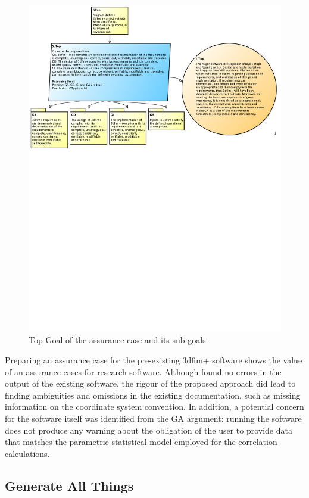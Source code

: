 \documentclass[final, 3p, times, authoryear]{elsarticle}
\begin{document}
\begin{figure}[!h]
\centering
\includegraphics[width=1.0\textwidth]{./figures/TopGoal.pdf}
\caption{Top Goal of the assurance case and its sub-goals}
\label{TopGoal}
\end{figure}

Preparing an assurance case for the pre-existing 3dfim+ software shows the value
of an assurance cases for research software. Although \citet{SmithEtAl2020}
found no errors in the output of the existing software, the rigour of the
proposed approach did lead to finding ambiguities and omissions in the existing
documentation, such as missing information on the coordinate system convention.
In addition, a potential concern for the software itself was identified from the
GA argument: running the software does not produce any warning about the
obligation of the user to provide data that matches the parametric statistical
model employed for the correlation calculations.

\subsection{Generate All Things} \label{Sec_GenAllThings}
\end{document}

